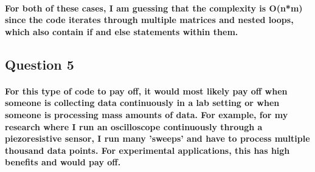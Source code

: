 \documentclass{article}
\begin{document}
    \paragraph{For both of these cases, I am guessing that the complexity is O(n*m) since the code iterates through multiple matrices and nested loops, which also contain if and else statements within them.}

\subsection{Question 5}

    \paragraph{For this type of code to pay off, it would most likely pay off when someone is collecting data continuously in a lab setting or when someone is processing mass amounts of data. For example, for my research where I run an oscilloscope continuously through a piezoresistive sensor, I run many 'sweeps' and have to process multiple thousand data points. For experimental applications, this has high benefits and would pay off. }
    
\end{document}
